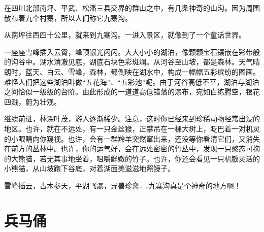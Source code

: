 \documentclass[12pt,UTF-8,openany]{ctexbook}
\begin{document}
\begin{large}
    
    在四川北部南坪、平武、松潘三县交界的群山之中，有几条神奇的山沟。因为周围散布着九个村寨，所以人们称它九寨沟。
    
    从南坪往西四十公里，就来到九寨沟。一进入景区，就像到了一个童话世界。
    
    一座座雪峰插入云霄，峰顶银光闪闪。大大小小的湖泊，像颗颗宝石镶嵌在彩带般的沟谷中。湖水清澈见底，湖底石块色彩斑斓。从河谷至山坡，都是森林。天气晴朗时，蓝天、白云、雪峰，森林，都倒映在湖水中，构成一幅幅五彩缤纷的图画。难怪人们把这些湖泊叫做“五花海”、“五彩池”呢。由于河谷高低不平，湖泊与湖泊之间恰似一级级的台阶。由此形成的一道道高低错落的瀑布，宛如白练腾空，银花四溅，蔚为壮观。
    
    继续前进，林深叶茂，游人逐渐稀少。注意，这时你已经来到珍稀动物经常出没的地区。也许，就在不远处，有一只金丝猴，正攀吊在一棵大树上，眨巴着一对机灵的小眼睛向你窥视。也许，会有一群羚羊突然窜出来，还没等你看清它们，又消失在前方的丛林中。也许，你的运气好，会在远处密密的竹丛中，发现一只憨态可掬的大熊猫，若无其事地坐着，咀嚼鲜嫩的竹子。也许，你还会看见一只机敏灵活的小熊猫，从山坡跑下谷底，对着湖面美滋滋地照镜子。
    
    雪峰插云，古木参天，平湖飞瀑，异兽珍禽……九寨沟真是个神奇的地方啊！
    
\end{large}



\chapter{兵马俑}
\end{document}
